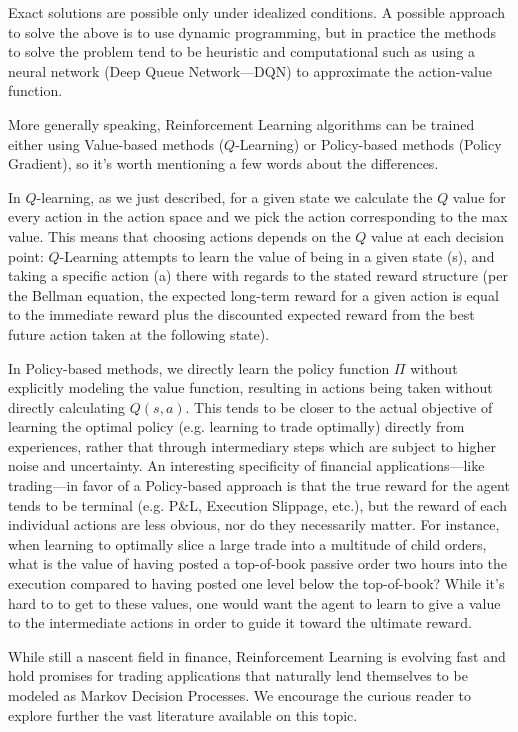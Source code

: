 Exact solutions are possible only under idealized conditions. A possible approach to solve the above is to use dynamic programming, but in practice the methods to solve the problem tend to be heuristic and computational such as using a neural network (Deep Queue Network---DQN) to approximate the action-value function.  



More generally speaking, Reinforcement Learning algorithms can be trained either using Value-based methods ($Q$-Learning) or Policy-based methods (Policy Gradient), so it's worth mentioning a few words about the differences.


In $Q$-learning, as we just described, for a given state we calculate the $Q$ value for every action in the action space and we pick the action corresponding to the max value. This means that choosing actions depends on the $Q$ value at each decision point: $Q$-Learning attempts to learn the value of being in a given state (s), and taking a specific action (a) there with regards to the stated reward structure (per the Bellman equation, the expected long-term reward for a given action is equal to the immediate reward plus the discounted expected reward from the best future action taken at the following state). 


In Policy-based methods, we directly learn the policy function $\Pi$ without explicitly modeling the value function, resulting in actions being taken without directly calculating $Q(s,a)$. This tends to be closer to the actual objective of learning the optimal policy (e.g. learning to trade optimally) directly from experiences, rather that through intermediary steps which are subject to higher noise and uncertainty. An interesting specificity of financial applications---like trading---in favor of a Policy-based approach is that the true reward for the agent tends to be terminal (e.g. P\&L, Execution Slippage, etc.), but the reward of each individual actions are less obvious, nor do they necessarily matter. For instance, when learning to optimally slice a large trade into a multitude of child orders, what is the value of having posted a top-of-book passive order two hours into the execution compared to having posted one level below the top-of-book? While it's hard to to get to these values, one would want the agent to learn to give a value to the intermediate actions in order to guide it toward the ultimate reward. 


While still a nascent field in finance, Reinforcement Learning is evolving fast and hold promises for trading applications that naturally lend themselves to be modeled as Markov Decision Processes. We encourage the curious reader to explore further the vast literature available on this topic.



